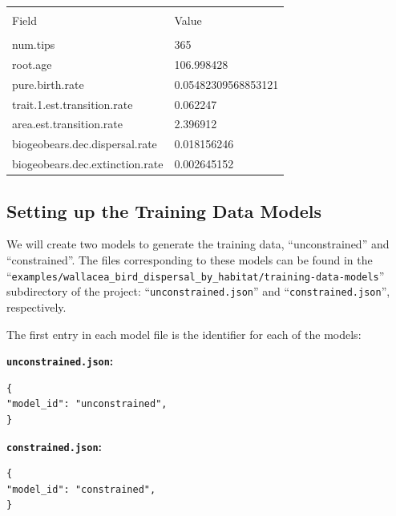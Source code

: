 \documentclass[11pt,openany]{memoir} %
\begin{document}
\begin{table}[htp]
\label{tbl:exampleProfile}
\begin{center}
\footnotesize
\begin{tabulary}{\linewidth}{ L L }
\hline \\ [-1.5ex] %
Field   &   Value \\
\hline \\ [-1.5ex] %
num.tips                        & 365 \\
root.age                        & 106.998428 \\
pure.birth.rate                 & 0.05482309568853121 \\
trait.1.est.transition.rate     & 0.062247 \\
area.est.transition.rate        & 2.396912 \\
biogeobears.dec.dispersal.rate  & 0.018156246 \\
biogeobears.dec.extinction.rate & 0.002645152 \\
\hline
\end{tabulary}
\end{center}
\end{table}%

\subsection{Setting up the Training Data Models}

We will create two models to generate the training data, ``unconstrained'' and ``constrained''.
The files corresponding to these models can be found in the ``\texttt{examples/wallacea\_bird\_dispersal\_by\_habitat/training-data-models}'' subdirectory of the project: ``\texttt{unconstrained.json}'' and ``\texttt{constrained.json}'', respectively.

The first entry in each model file is the identifier for each of the models:

\begin{minipage}[t]{0.475\textwidth}
\textbf{\texttt{unconstrained.json}:}
\begin{lstlisting}
{
"model_id": "unconstrained",
}\end{lstlisting}
\end{minipage}
\begin{minipage}[t]{0.475\textwidth}
\textbf{\texttt{constrained.json}:}
\begin{lstlisting}
{
"model_id": "constrained",
}\end{lstlisting}
\end{minipage}
\end{document}

